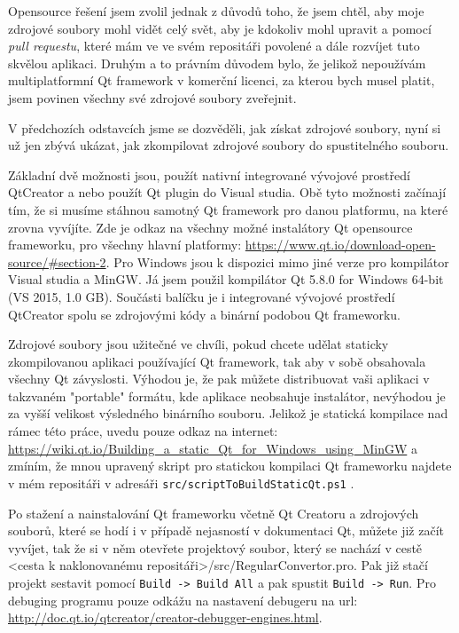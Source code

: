 Opensource řešení jsem zvolil jednak z důvodů toho, že jsem chtěl, aby moje zdrojové soubory mohl vidět celý svět, aby je kdokoliv mohl upravit a pomocí \textit{pull requestu}, které mám ve ve svém repositáři povolené a dále rozvíjet tuto skvělou aplikaci. Druhým a to právním důvodem bylo, že jelikož nepoužívám multiplatformní Qt framework v komerční licenci, za kterou bych musel platit, jsem povinen všechny své zdrojové soubory zveřejnit.

V předchozích odstavcích jsme se dozvěděli, jak získat zdrojové soubory, nyní si už jen zbývá ukázat, jak zkompilovat zdrojové soubory do spustitelného souboru. 

Základní dvě možnosti jsou, použít nativní integrované vývojové prostředí QtCreator a nebo použít Qt plugin do Visual studia. Obě tyto možnosti začínají tím, že si musíme stáhnou samotný Qt framework pro danou platformu, na které zrovna vyvíjíte. Zde je odkaz na všechny možné instalátory Qt opensource frameworku, pro všechny hlavní platformy: \url{https://www.qt.io/download-open-source/#section-2}. Pro Windows jsou k dispozici mimo jiné verze pro kompilátor Visual studia a MinGW. Já jsem použil kompilátor Qt 5.8.0 for Windows 64-bit (VS 2015, 1.0 GB). Součásti balíčku je i integrované vývojové prostředí QtCreator spolu se zdrojovými kódy a binární podobou Qt frameworku. 

Zdrojové soubory jsou užitečné ve chvíli, pokud chcete udělat staticky zkompilovanou aplikaci používající Qt framework, tak aby v sobě obsahovala všechny Qt závyslosti. Výhodou je, že pak můžete distribuovat vaši aplikaci v takzvaném "portable" formátu, kde aplikace neobsahuje instalátor, nevýhodou je za vyšší velikost výsledného binárního souboru. Jelikož je statická kompilace nad rámec této práce, uvedu pouze odkaz na internet: \url{https://wiki.qt.io/Building_a_static_Qt_for_Windows_using_MinGW} a zmíním, že mnou upravený skript pro statickou kompilaci Qt frameworku najdete v mém repositáři v adresáři \texttt{src/scriptToBuildStaticQt.ps1} .

Po stažení a nainstalování Qt frameworku včetně Qt Creatoru a zdrojových souborů, které se hodí i v případě nejasností v dokumentaci Qt, můžete již začít vyvíjet, tak že si v něm otevřete projektový soubor, který se nachází v cestě <cesta k naklonovanému repositáři>/src/RegularConvertor.pro. Pak již stačí projekt sestavit pomocí \texttt{Build -> Build All} a pak spustit \texttt{Build -> Run}. Pro debuging programu pouze odkážu na nastavení debugeru na url: \url{http://doc.qt.io/qtcreator/creator-debugger-engines.html}.   

